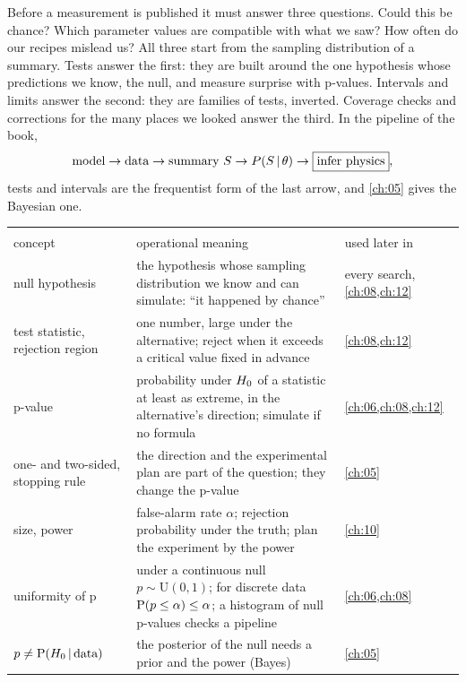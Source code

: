 Before a measurement is published it must answer three questions. Could this be
chance? Which parameter values are compatible with what we saw? How often do
our recipes mislead us? All three start from the sampling distribution of a
summary. Tests answer the first: they are built around the one hypothesis
whose predictions we know, the null, and measure surprise with p-values.
Intervals and limits answer the second: they are families of tests, inverted.
Coverage checks and corrections for the many places we looked answer the third.
In the pipeline of the book,
\[
  \text{model}\to\text{data}\to\text{summary }S\to P(S\,\vert\,\theta)\to\boxed{\text{infer physics}},
\]
tests and intervals are the frequentist form of the last arrow, and
\cref{ch:05} gives the Bayesian one.

\begin{center}
\small
\renewcommand{\arraystretch}{1.15}
\begin{tabularx}{\linewidth}{@{}>{\raggedright\arraybackslash}p{3.3cm}
                               >{\raggedright\arraybackslash}X
                               >{\raggedright\arraybackslash}p{2.7cm}@{}}
\toprule
\multicolumn{3}{@{}l}{\textbf{Testing the null (first half)}}\\
concept & operational meaning & used later in\\\midrule
null hypothesis & the hypothesis whose sampling distribution we know and can simulate: ``it happened by chance'' & every search, \cref{ch:08,ch:12}\\
test statistic, rejection region & one number, large under the alternative; reject when it exceeds a critical value fixed in advance & \cref{ch:08,ch:12}\\
p-value & probability under $H_0$ of a statistic at least as extreme, in the alternative's direction; simulate if no formula & \cref{ch:06,ch:08,ch:12}\\
one- and two-sided, stopping rule & the direction and the experimental plan are part of the question; they change the p-value & \cref{ch:05}\\
size, power & false-alarm rate $\alpha$; rejection probability under the truth; plan the experiment by the power & \cref{ch:10}\\
uniformity of p & under a continuous null $p\sim\mathrm{U}(0,1)$; for discrete data $\operatorname{P}(p\le\alpha)\le\alpha$; a histogram of null p-values checks a pipeline & \cref{ch:06,ch:08}\\
$p\ne\operatorname{P}(H_0\,\vert\,\text{data})$ & the posterior of the null needs a prior and the power (Bayes) & \cref{ch:05}\\

\end{tabularx}
\end{center}
